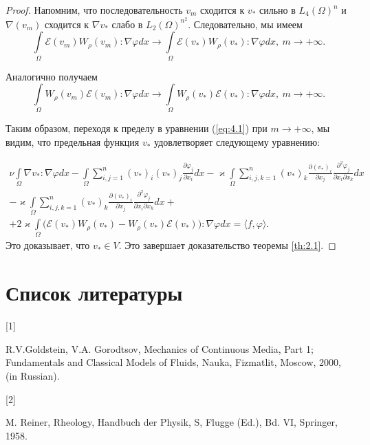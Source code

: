 \begin{proof}
    Напомним, что последовательность $v_m$ сходится к $v_*$ сильно в $L_4(\Omega)^n$
    и $\nabla(v_m)$ сходится к $\nabla v_*$ слабо в $L_2(\Omega)^{n^2}$.
    Следовательно, мы имеем
    $$\int\limits_{\Omega}\mathcal{E}(v_m) W_\rho(v_m): \nabla\varphi dx \rightarrow
    \int\limits_{\Omega}\mathcal{E}(v_*) W_\rho(v_*): \nabla\varphi dx, \ m \rightarrow +\infty.$$

    Аналогично получаем
    $$\int\limits_{\Omega}W_\rho(v_m)\mathcal{E}(v_m): \nabla\varphi dx \rightarrow
    \int\limits_{\Omega}W_\rho(v_*)\mathcal{E}(v_*): \nabla\varphi dx, \ m \rightarrow +\infty.$$

    Таким образом, переходя к пределу в уравнении (\ref{eq:4.1}) при $m \rightarrow +\infty$,
    мы видим, что предельная функция $v_*$ удовлетворяет следующему уравнению:

    \begin{equation*}
        \begin{gathered}
            \nu\int\limits_{\Omega}\nabla v_*: \nabla\varphi dx -
            \int\limits_{\Omega}\sum_{i,j=1}^n (v_*)_i (v_*)_j \frac{\partial \varphi_j}{\partial x_i} dx
            - \varkappa \int\limits_{\Omega}\sum_{i,j,k=1}^n (v_*)_k \frac{\partial (v_*)_i}{\partial x_j}
            \frac{\partial^2 \varphi_j}{\partial x_i \partial x_k} dx \\
            - \varkappa \int\limits_{\Omega}\sum_{i,j,k=1}^n (v_*)_k \frac{\partial (v_*)_i}{\partial x_j}
            \frac{\partial^2 \varphi_j}{\partial x_i \partial x_k} dx + \\ + 2 \varkappa
            \int\limits_{\Omega}\bigg(\mathcal{E}(v_*) W_\rho(v_*) - W_\rho(v_*)\mathcal{E}(v_*)\bigg): \nabla\varphi dx = \langle f, \varphi \rangle.
        \end{gathered}
    \end{equation*}
    Это доказывает, что $v_* \in V$. Это завершает доказательство теоремы \ref{th:2.1}.
\end{proof}

\clearpage
\section{Список литературы}

\hypertarget{L1}{[1]} R.V.Goldstein, V.A. Gorodtsov, Mechanics of Continuous Media, Part 1; Fundamentals and
Classical Models of Fluids, Nauka, Fizmatlit, Moscow, 2000, (in Russian).

\hypertarget{L2}{[2]} M. Reiner, Rheology, Handbuch der Physik, S, Flugge (Ed.), Bd. VI, Springer, 1958.

